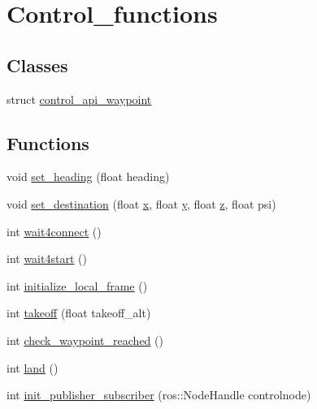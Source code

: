 \hypertarget{group__control__functions}{}\section{Control\+\_\+functions}
\label{group__control__functions}
\subsection*{Classes}
\begin{DoxyCompactItemize}
\item 
struct \mbox{\hyperlink{structcontrol__api__waypoint}{control\+\_\+api\+\_\+waypoint}}
\end{DoxyCompactItemize}
\subsection*{Functions}
\begin{DoxyCompactItemize}
\item 
void \mbox{\hyperlink{group__control__functions_ga92292bc0da7dd2a58edf8e9aa10eb682}{set\+\_\+heading}} (float heading)
\item 
void \mbox{\hyperlink{group__control__functions_gab90a45d8b081ba329b9d0f886adbc2d5}{set\+\_\+destination}} (float \mbox{\hyperlink{keyTalker_8cpp_af88b946fb90d5f08b5fb740c70e98c10}{x}}, float \mbox{\hyperlink{keyTalker_8cpp_ab927965981178aa1fba979a37168db2a}{y}}, float \mbox{\hyperlink{keyTalker_8cpp_ab3e6ed577a7c669c19de1f9c1b46c872}{z}}, float psi)
\item 
int \mbox{\hyperlink{group__control__functions_ga1921a30d419eb397f7e40875217b45d1}{wait4connect}} ()
\item 
int \mbox{\hyperlink{group__control__functions_gab6fe46f505ab9804b4ed98b96286a811}{wait4start}} ()
\item 
int \mbox{\hyperlink{group__control__functions_ga2a1100bb15673a9322c5be3bb8e9999f}{initialize\+\_\+local\+\_\+frame}} ()
\item 
int \mbox{\hyperlink{group__control__functions_gac0aa671c99c09687515ec5bb8891c7d2}{takeoff}} (float takeoff\+\_\+alt)
\item 
int \mbox{\hyperlink{group__control__functions_ga54abc3f6eae022a8710bc0c2e1c54fbe}{check\+\_\+waypoint\+\_\+reached}} ()
\item 
int \mbox{\hyperlink{group__control__functions_ga52a11a139e56315de52d2ab439b0d203}{land}} ()
\item 
int \mbox{\hyperlink{group__control__functions_gae693b071b5392f9253cdfc1f4f362fcc}{init\+\_\+publisher\+\_\+subscriber}} (ros\+::\+Node\+Handle controlnode)
\end{DoxyCompactItemize}



